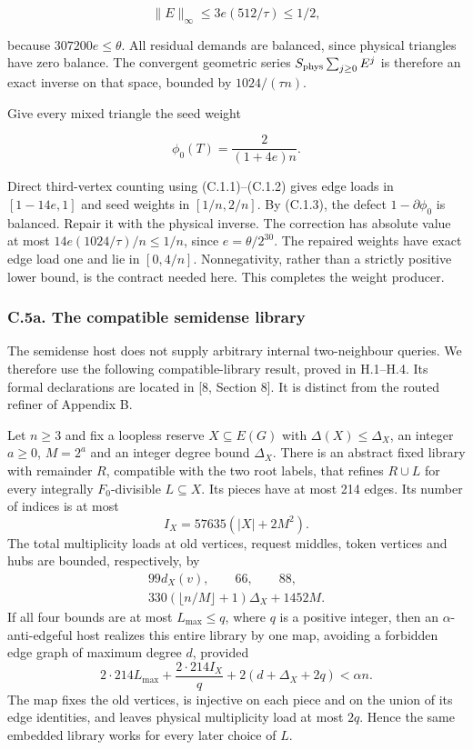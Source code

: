 \documentclass[english,11pt,a4paper]{article}
\begin{document}
\[\|E\|_\infty\le3e(512/\tau)\le1/2,
\tag{C.5.5}\]

because \(307200e\le\theta\). All residual demands are balanced, since physical triangles have zero balance. The convergent geometric series \(S_{\rm phys}\sum_{j\ge0}E^j\) is therefore an exact inverse on that space, bounded by \(1024/(\tau n)\).

Give every mixed triangle the seed weight

\[\phi_0(T)=\frac2{(1+4e)n}.
\tag{C.5.6}\]

Direct third-vertex counting using (C.1.1)--(C.1.2) gives edge loads in \([1-14e,1]\) and seed weights in \([1/n,2/n]\). By (C.1.3), the defect \(1-\partial\phi_0\) is balanced. Repair it with the physical inverse. The correction has absolute value at most \(14e(1024/\tau)/n\le1/n\), since \(e=\theta/2^{30}\). The repaired weights have exact edge load one and lie in \([0,4/n]\). Nonnegativity, rather than a strictly positive lower bound, is the contract needed here. This completes the weight producer.

\subsubsection{C.5a. The compatible semidense library}\label{c.5a.-the-compatible-semidense-library}

The semidense host does not supply arbitrary internal two-neighbour queries. We therefore use the following compatible-library result, proved in H.1--H.4. Its formal declarations are located in {[}8, Section 8{]}. It is distinct from the routed refiner of Appendix B.

Let \(n\ge3\) and fix a loopless reserve \(X\subseteq E(G)\) with \(\Delta(X)\le\Delta_X\), an integer \(a\ge0\), \(M=2^a\) and an integer degree bound \(\Delta_X\). There is an abstract fixed library with remainder \(R\), compatible with the two root labels, that refines \(R\cup L\) for every integrally \(F_0\)-divisible \(L\subseteq X\). Its pieces have at most 214 edges. Its number of indices is at most \[I_X=57635(|X|+2M^2).\] The total multiplicity loads at old vertices, request middles, token vertices and hubs are bounded, respectively, by \[\begin{gathered}
99d_X(v),\qquad66,\qquad88,\\
330(\lfloor n/M\rfloor+1)\Delta_X+1452M.
\end{gathered}\] If all four bounds are at most \(L_{\max}\le q\), where \(q\) is a positive integer, then an \(\alpha\)-anti-edgeful host realizes this entire library by one map, avoiding a forbidden edge graph of maximum degree \(d\), provided \[2\cdot214L_{\max}+\frac{2\cdot214 I_X}{q}
+2(d+\Delta_X+2q)<\alpha n.\] The map fixes the old vertices, is injective on each piece and on the union of its edge identities, and leaves physical multiplicity load at most \(2q\). Hence the same embedded library works for every later choice of \(L\).
\end{document}
